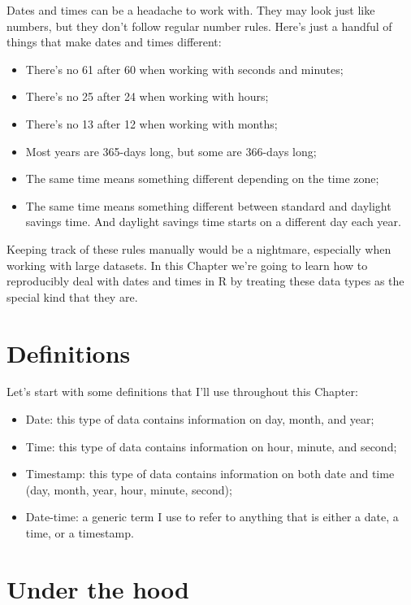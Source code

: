 \documentclass[
]{book}
\providecommand{\tightlist}{%
  \setlength{\itemsep}{0pt}\setlength{\parskip}{0pt}}
\begin{document}
Dates and times can be a headache to work with. They may look just like numbers, but they don't follow regular number rules. Here's just a handful of things that make dates and times different:

\begin{itemize}
\tightlist
\item
  There's no 61 after 60 when working with seconds and minutes;
\item
  There's no 25 after 24 when working with hours;
\item
  There's no 13 after 12 when working with months;
\item
  Most years are 365-days long, but some are 366-days long;
\item
  The same time means something different depending on the time zone;
\item
  The same time means something different between standard and daylight savings time. And daylight savings time starts on a different day each year.
\end{itemize}

Keeping track of these rules manually would be a nightmare, especially when working with large datasets. In this Chapter we're going to learn how to reproducibly deal with dates and times in R by treating these data types as the special kind that they are.

\hypertarget{definitions}{%
\section{Definitions}\label{definitions}}

Let's start with some definitions that I'll use throughout this Chapter:

\begin{itemize}
\tightlist
\item
  Date: this type of data contains information on day, month, and year;
\item
  Time: this type of data contains information on hour, minute, and second;
\item
  Timestamp: this type of data contains information on both date and time (day, month, year, hour, minute, second);
\item
  Date-time: a generic term I use to refer to anything that is either a date, a time, or a timestamp.
\end{itemize}

\hypertarget{under-the-hood}{%
\section{Under the hood}\label{under-the-hood}}
\end{document}
